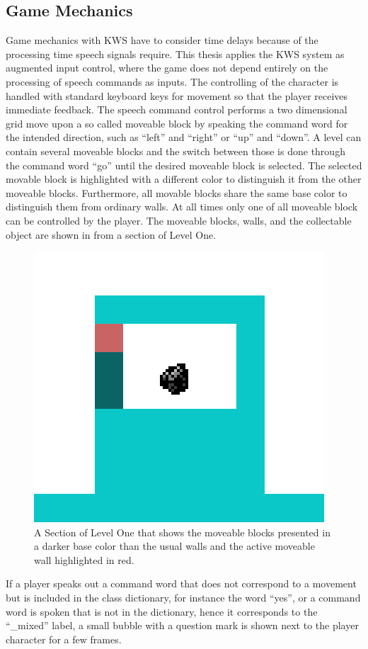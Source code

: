 \subsection{Game Mechanics}\label{sec:game_design_mechanics}
Game mechanics with KWS have to consider time delays because of the processing time speech signals require.
This thesis applies the KWS system as augmented input control, where the game does not depend entirely on the processing of speech commands as inputs.
The controlling of the character is handled with standard keyboard keys for movement so that the player receives immediate feedback. 
The speech command control performs a two dimensional grid move upon a so called moveable block by speaking the command word for the intended direction, such as \enquote{left} and \enquote{right} or \enquote{up} and \enquote{down}.
A level can contain several moveable blocks and the switch between those is done through the command word \enquote{go} until the desired moveable block is selected.
The selected movable block is highlighted with a different color to distinguish it from the other moveable blocks.
Furthermore, all movable blocks share the same base color to distinguish them from ordinary walls.
At all times only one of all moveable block can be controlled by the player.
The moveable blocks, walls, and the collectable object are shown in  from a section of Level One.
\begin{figure}[!ht]
  \centering
  \includegraphics[height=0.25\textwidth]{./6_game/figs/game_design_mechanic_thing.png}
  \caption{A Section of Level One that shows the moveable blocks presented in a darker base color than the usual walls and the active moveable wall highlighted in red.}
  \label{fig:game_design_mechanic_thing}
\end{figure}
\FloatBarrier
\noindent
If a player speaks out a command word that does not correspond to a movement but is included in the class dictionary, for instance the word \enquote{yes}, or a command word is spoken that is not in the dictionary, hence it corresponds to the \enquote{\_mixed} label, a small bubble with a question mark is shown next to the player character for a few frames.
